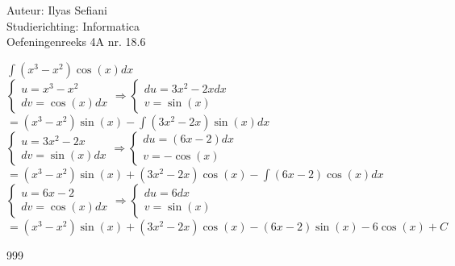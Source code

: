 \documentclass[a4paper]{article}
\begin{document}
\noindent \large Auteur: Ilyas Sefiani \\
\noindent \large Studierichting: Informatica\\
\noindent \large Oefeningenreeks 4A nr. 18.6\\

\medskip

\normalsize

$\displaystyle\int (x^3-x^2)\cos(x)dx$\\

$\left \{
\begin{array}{l}
u = x^3-x^2 \\
dv = \cos(x)dx
\end{array}
\right .
\Rightarrow
\left \{
\begin{array}{l}
du = 3x^2-2xdx \\
v = \sin(x)
\end{array}
\right .$\\

$=(x^3-x^2)\sin(x) - \displaystyle\int (3x^2-2x)\sin(x)dx$\\

$\left \{
\begin{array}{l}
u = 3x^2-2x  \\
dv = \sin(x)dx
\end{array}
\right .
\Rightarrow
\left \{
\begin{array}{l}
du = (6x-2)dx \\
v = -\cos(x)
\end{array}
\right .$\\

$=(x^3-x^2)\sin(x)+ (3x^2-2x)\cos(x)- \displaystyle\int (6x-2)\cos(x)dx$\\

$\left \{
\begin{array}{l}
u = 6x-2 \\
dv = \cos(x)dx
\end{array}
\right .
\Rightarrow
\left \{
\begin{array}{l}
du = 6dx \\
v = \sin(x)
\end{array}
\right .$\\

$=(x^3-x^2)\sin(x)+ (3x^2-2x)\cos(x)-(6x-2)\sin(x)-6\cos(x)+C$\\

\begin{thebibliography}{999}
\end{thebibliography}
\end{document}
